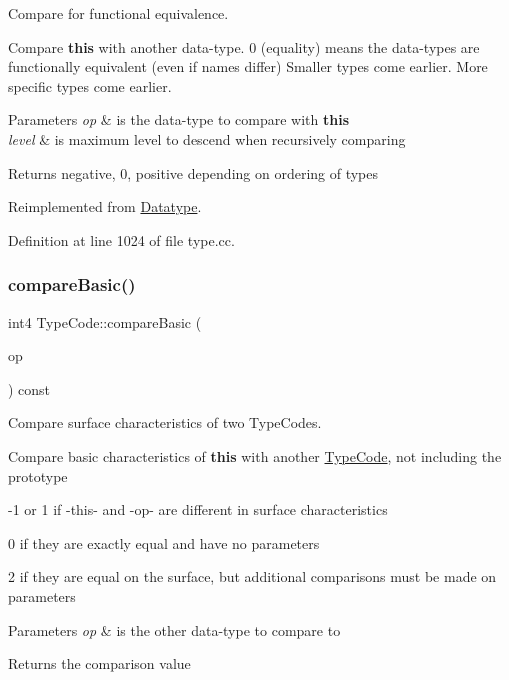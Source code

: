 Compare for functional equivalence. 

Compare {\bfseries{this}} with another data-\/type. 0 (equality) means the data-\/types are functionally equivalent (even if names differ) Smaller types come earlier. More specific types come earlier. 
\begin{DoxyParams}{Parameters}
{\em op} & is the data-\/type to compare with {\bfseries{this}} \\
\hline
{\em level} & is maximum level to descend when recursively comparing \\
\hline
\end{DoxyParams}
\begin{DoxyReturn}{Returns}
negative, 0, positive depending on ordering of types 
\end{DoxyReturn}


Reimplemented from \mbox{\hyperlink{class_datatype_a4d5a102b2d909180c3080fdb55d7b305}{Datatype}}.



Definition at line 1024 of file type.\+cc.

\mbox{\label{class_type_code_a281927644a409f943d0ed740c510227a}} 
\subsubsection{\texorpdfstring{compareBasic()}{compareBasic()}}
{\footnotesize\ttfamily int4 Type\+Code\+::compare\+Basic (\begin{DoxyParamCaption}\item[{const \mbox{\hyperlink{class_type_code}{Type\+Code}} $\ast$}]{op }\end{DoxyParamCaption}) const}



Compare surface characteristics of two Type\+Codes. 

Compare basic characteristics of {\bfseries{this}} with another \mbox{\hyperlink{class_type_code}{Type\+Code}}, not including the prototype
\begin{DoxyItemize}
\item -\/1 or 1 if -\/this-\/ and -\/op-\/ are different in surface characteristics
\item 0 if they are exactly equal and have no parameters
\item 2 if they are equal on the surface, but additional comparisons must be made on parameters 
\begin{DoxyParams}{Parameters}
{\em op} & is the other data-\/type to compare to \\
\hline
\end{DoxyParams}
\begin{DoxyReturn}{Returns}
the comparison value 
\end{DoxyReturn}

\end{DoxyItemize}

